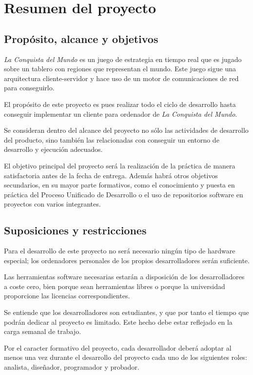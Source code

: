 \section{Resumen del proyecto}

\subsection{Propósito, alcance y objetivos}

\textit{La Conquista del Mundo} es un juego de estrategia en tiempo real que es
jugado sobre un tablero con regiones que representan el mundo. Este juego sigue
una arquitectura cliente-servidor y hace uso de un motor de comunicaciones de
red para conseguirlo.

El propósito de este proyecto es pues realizar todo el ciclo de desarrollo hasta
conseguir implementar un cliente para ordenador de \textit{La Conquista del
Mundo}.

Se consideran dentro del alcance del proyecto no sólo las actividades de
desarrollo del producto, sino también las relacionadas con conseguir un entorno
de desarrollo y ejecución adecuados.

El objetivo principal del proyecto será la realización de la práctica de manera
satisfactoria antes de la fecha de entrega. Además habrá otros objetivos
secundarios, en su mayor parte formativos, como el conocimiento y puesta en
práctica del Proceso Unificado de Desarrollo o el uso de repositorios software
en proyectos con varios integrantes.

\subsection{Suposiciones y restricciones}

Para el desarrollo de este proyecto no será necesario ningún tipo de hardware
especial; los ordenadores personales de los propios desarrolladores serán
suficiente.

Las herramientas software necesarias estarán a disposición de los
desarrolladores a coste cero, bien porque sean herramientas libres o porque la
universidad proporcione las licencias correspondientes.

Se entiende que los desarrolladores son estudiantes, y que por tanto el tiempo
que podrán dedicar al proyecto es limitado. Este hecho debe estar reflejado en
la carga semanal de trabajo.

Por el caracter formativo del proyecto, cada desarrollador deberá adoptar al
menos una vez durante el desarrollo del proyecto cada uno de los siguientes
roles: analista, diseñador, programador y probador.

